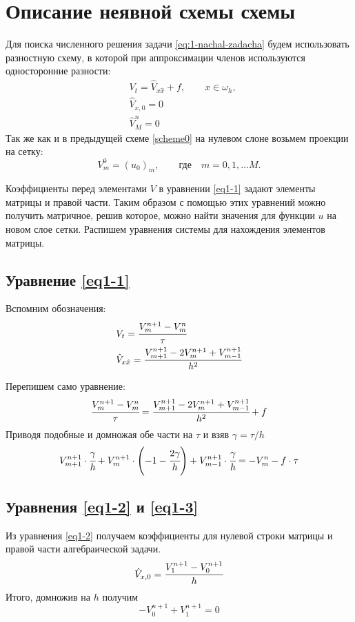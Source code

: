 \documentclass[12pt]{extarticle}
\numberwithin{equation}{section}
\begin{document}
\section{Описание неявной схемы схемы} \label{scheme}
Для поиска численного решения задачи \ref{eq:1-nachal-zadacha} будем использовать разностную схему, в которой при аппроксимации членов используются односторонние разности:
	\begin{align}
		&V_t= \hat{V}_{x \hat x} + f,\qquad x \in \omega_h, \label{eq1-1}\\
		&\hat V_{x, 0} = 0 \label{eq1-2}\\
		&{\hat V^n_M} = 0 \label{eq1-3}
	\end{align}
Так же как и в предыдущей схеме \ref{scheme0} на нулевом слоне возьмем проекции на сетку:
$$V_m^0 = (u_0)_m, \qquad \mbox{где} \quad m = 0, 1, \dots M.$$

Коэффициенты перед элементами $V$ в уравнении \ref{eq1-1} задают элементы матрицы и правой части.
Таким образом с помощью этих уравнений можно получить матричное, решив которое, можно найти значения для функции $u$ на новом слое сетки.
Распишем уравнения системы для нахождения элементов матрицы.

\subsection{Уравнение \ref{eq1-1}}
Вспомним обозначения:
\begin{align}
&V_t = \cfrac{V_m^{n+1} - V_m^n}{\tau} \label{eq2:1:1}\\
&\hat V_{x \hat x} = \cfrac{V_{m+1}^{n+1} - 2V_m^{n+1} + V_{m-1}^{n+1}}{h^2} \label{eq:2:1:2}
\end{align}

Перепишем само уравнение:
$$\cfrac{V_m^{n+1} - V_m^n}{\tau} = \cfrac{V_{m+1}^{n+1} - 2V_m^{n+1} + V_{m-1}^{n+1}}{h^2} + f
$$
Приводя подобные и домножая обе части на $\tau$ и взяв $\gamma = \tau/h$
\begin{equation}
 V_{m+1}^{n+1} \cdot \cfrac{\gamma}{h} + V_m^{n+1} \cdot \left( -1 - \cfrac{2\gamma}{h}\right) + V_{m-1}^{n+1} \cdot \cfrac{\gamma}{h} = -V_m^n - f \cdot \tau
 \label{eq2:1:final}
\end{equation}

\subsection{Уравнения \ref{eq1-2} и \ref{eq1-3}}
Из уравнения \ref{eq1-2} получаем коэффициенты для нулевой строки матрицы и правой части алгебраической задачи.
\begin{align*}
&\hat V_{x, 0} = \cfrac{V_1^{n+1} - V_0^{n+1}}{h}\\
\end{align*}
Итого, домножив на $h$ получим
\begin{equation}
-V_0^{n+1} + V_{1}^{n+1} = 0 \label{eq:2final}
\end{equation}
\end{document}
